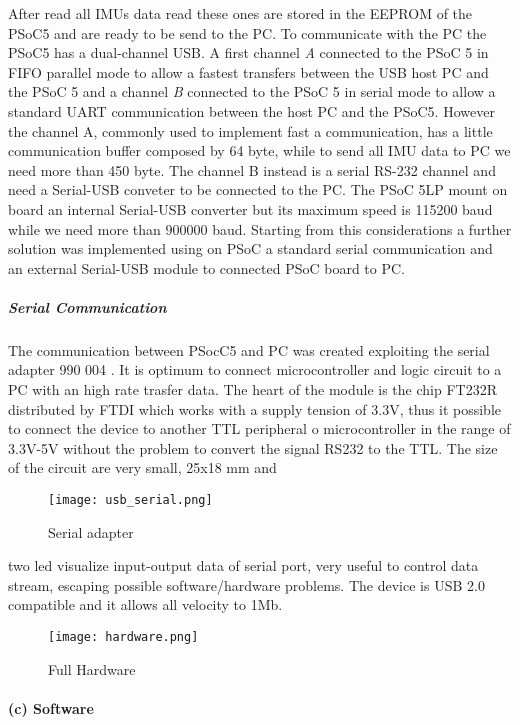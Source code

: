 After read all IMUs data read these ones are stored in the EEPROM of the PSoC5 and are ready to be send to the PC. To communicate with the PC the PSoC5 has a dual-channel USB. A first channel \textit{A} %
connected to the PSoC 5 in FIFO parallel mode to allow a fastest transfers between the USB host PC and the PSoC 5 and a channel \textit{B} connected to the PSoC 5 in serial mode to allow a standard UART communication between the host PC and the PSoC5. However the channel A, commonly used to implement fast a communication, has a little communication buffer composed by 64 byte, while to send all IMU data to PC we need more than 450 byte. The channel B instead is a serial RS-232 channel and need a Serial-USB conveter to be connected to the PC. The PSoC 5LP mount on board an internal Serial-USB converter but its maximum speed is 115200 baud while we need more than 900000 baud.
Starting from this considerations a further solution was implemented using on PSoC a standard serial communication and an external Serial-USB module to connected PSoC board to PC.     

\subparagraph{Serial Communication}

The communication between PSocC5 and PC was created exploiting the serial adapter 990 004 \cite{riferimento}. It is optimum to connect microcontroller and logic circuit to a PC with an high rate trasfer data. The heart of the module is the chip FT232R distributed by FTDI \cite{riferimento} which works with a supply tension of 3.3V, thus it possible to connect the device to another TTL peripheral o microcontroller in the range of 3.3V-5V without the problem to convert the signal RS232 to  the TTL. The size of the circuit are very small, 25x18 mm and
\begin{figure}[h]
\centering
\texttt{[image: usb\_serial.png]}
\caption{Serial adapter}
\label{fig:serial_adapter}
\end{figure}
two led visualize input-output data of serial port, very useful to control data stream, escaping possible software/hardware problems. The device is USB 2.0 compatible and it allows all velocity to 1Mb. 

\begin{figure}[h]
\centering
\texttt{[image: hardware.png]}
\caption{Full Hardware}
\label{fig:hardware}
\end{figure}


\paragraph{(c) Software}

